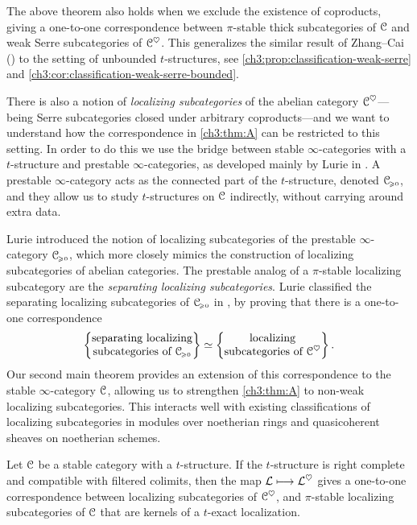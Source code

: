 The above theorem also holds when we exclude the existence of coproducts, giving a one-to-one correspondence between $\pi$-stable thick subcategories of $\EuScript{C}$ and weak Serre subcategories of $\EuScript{C}^\heartsuit$. This generalizes the similar result of Zhang--Cai (\cite{zhang-cai_2017}) to the setting of unbounded $t$-structures, see \cref{ch3:prop:classification-weak-serre} and \cref{ch3:cor:classification-weak-serre-bounded}. 

There is also a notion of \emph{localizing subcategories} of the abelian category $\EuScript{C}^\heartsuit$---being Serre subcategories closed under arbitrary coproducts---and we want to understand how the correspondence in \cref{ch3:thm:A} can be restricted to this setting. In order to do this we use the bridge between stable $\infty$-categories with a $t$-structure and prestable $\infty$-categories, as developed mainly by Lurie in \cite[App. C]{lurie_SAG}. A prestable $\infty$-category acts as the connected part of the $t$-structure, denoted $\EuScript{C}_{\hspace{-1pt}\scriptscriptstyle\geqslant 0}$, and they allow us to study $t$-structures on $\EuScript{C}$ indirectly, without carrying around extra data. 

Lurie introduced the notion of localizing subcategories of the prestable $\infty$-category $\EuScript{C}_{\hspace{-1pt}\scriptscriptstyle\geqslant 0}$, which more closely mimics the construction of localizing subcategories of abelian categories. The prestable analog of a $\pi$-stable localizing subcategory are the \emph{separating localizing subcategories}. Lurie classified the separating localizing subcategories of $\EuScript{C}_{\hspace{-1pt}\scriptscriptstyle\geqslant 0}$ in \cite[C.5.2.7]{lurie_SAG}, by proving that there is a one-to-one correspondence
\[\left\{ \begin{matrix} \text{separating localizing}\\ \text{subcategories of }\EuScript{C}_{\hspace{-1pt}\scriptscriptstyle\geqslant 0} \end{matrix} \right\} \simeq \left\{ \begin{matrix} \text{localizing}\\ \text{subcategories of }\EuScript{C}^\heartsuit \end{matrix} \right\}.\]
Our second main theorem provides an extension of this correspondence to the stable $\infty$-category $\EuScript{C}$, allowing us to strengthen \cref{ch3:thm:A} to non-weak localizing subcategories. This interacts well with existing classifications of localizing subcategories in modules over noetherian rings and quasicoherent sheaves on noetherian schemes. 


\begin{introthm}
    \label{ch3:thm:B}
    Let $\EuScript{C}$ be a stable category with a $t$-structure. If the $t$-structure is right complete and compatible with filtered colimits, then the map $\mathcal{L}\longmapsto \mathcal{L}^\heartsuit$ gives a one-to-one correspondence between localizing subcategories of $\EuScript{C}^\heartsuit$, and $\pi$-stable localizing subcategories of $\EuScript{C}$ that are kernels of a $t$-exact localization.
\end{introthm}

